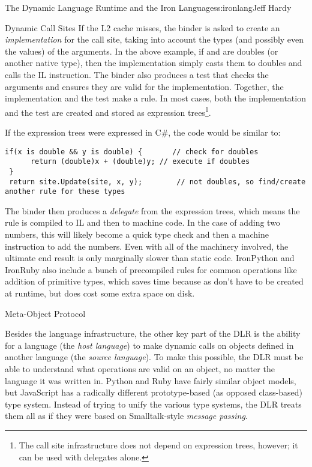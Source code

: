 \begin{aosachapter}{The Dynamic Language Runtime and the Iron Languages}{s:ironlang}{Jeff Hardy}
\begin{aosasect1}{Dynamic Call Sites}
If the L2 cache misses, the binder is asked to create an \emph{implementation} for the call site, taking into account the types (and possibly even the values) of the arguments. In the above example, if  and  are doubles (or another native type), then the implementation simply casts them to doubles and calls the IL  instruction. The binder also produces a test that checks the arguments and ensures they are valid for the implementation. Together, the implementation and the test make a rule. In most cases, both the implementation and the test are created and stored as expression trees\footnote{The call site infrastructure does not depend on expression trees, however; it can be used with delegates alone.}.

If the expression trees were expressed in C\#, the code would be similar to:

\begin{verbatim}
if(x is double && y is double) {       // check for doubles
      return (double)x + (double)y; // execute if doubles
 }
 return site.Update(site, x, y);        // not doubles, so find/create another rule for these types
\end{verbatim}

The binder then produces a \emph{delegate} from the expression trees, which means the rule is compiled to IL and then to machine code. In the case of adding two numbers, this will likely become a quick type check and then a machine instruction to add the numbers. Even with all of the machinery involved, the ultimate end result is only marginally slower than static code. IronPython and IronRuby also include a bunch of precompiled rules for common operations like addition of primitive types, which saves time because as don't have to be created at runtime, but does cost some extra space on disk.

\end{aosasect1}

\begin{aosasect1}{Meta-Object Protocol}

Besides the language infrastructure, the other key part of the DLR is the ability for a language (the \emph{host language}) to make dynamic calls on objects defined in another language (the \emph{source language}). To make this possible, the DLR must be able to understand what operations are valid on an object, no matter the language it was written in. Python and Ruby have fairly similar object models, but JavaScript has a radically different prototype-based (as opposed class-based) type system. Instead of trying to unify the various type systems, the DLR treats them all as if they were based on Smalltalk-style \emph{message passing}.


\end{aosasect1}
\end{aosachapter}
